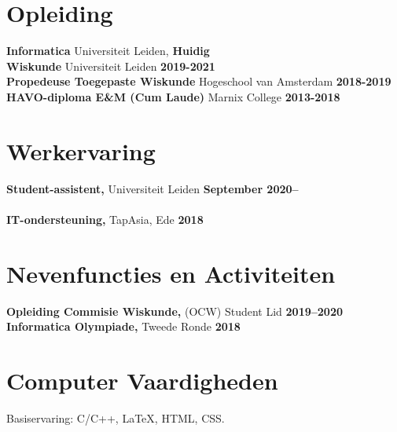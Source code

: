 \documentclass[margin,line]{res}
\begin{document}
\newcommand{\myname}{Tim ~Greven}
\newlength{\mynamewidth}
\settowidth{\mynamewidth}{\namefont\myname}

\name{\hspace*{0.5\textwidth}\hspace{-0.5\mynamewidth} \myname \vspace*{.1in}}






\section{\sc Opleiding}
{\bf Informatica} Universiteit Leiden, \hfill {\bf Huidig}\\
{\bf Wiskunde} Universiteit Leiden \hfill {\bf 2019-2021}\\
{\bf Propedeuse Toegepaste Wiskunde} Hogeschool van Amsterdam \hfill {\bf 2018-2019}\\
{\bf HAVO-diploma E\&M (Cum Laude)} Marnix College \hfill {\bf 2013-2018}\\


\section{\sc Werkervaring}
{\bf Student-assistent,} Universiteit Leiden \hfill {\bf September 2020--}\\
\\
{\bf IT-ondersteuning,} TapAsia, Ede \hfill {\bf  2018}\\

\vspace{-1em}


\vspace{-1em}


\section{\sc Nevenfuncties en Activiteiten}
{\bf Opleiding Commisie Wiskunde,} (OCW) Student Lid \hfill{\bf 2019--2020}
\\
{\bf Informatica Olympiade,} Tweede Ronde \hfill{\bf 2018}



\section{\sc Computer Vaardigheden}
Basiservaring: C/C++, \LaTeX, HTML, CSS.
\end{document}
